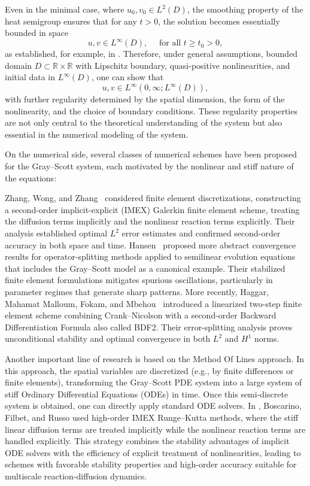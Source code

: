 \documentclass[11pt, a4paper]{amsart}
\newcommand{\RR}{\mathbb{R}}
\numberwithin{equation}{section}
\begin{document}
	Even in the minimal case, where $u_0,v_0\in L^2(D)$, the smoothing property of the heat semigroup ensures that for any $t>0$, the solution becomes essentially bounded in space
	\[
	u, v \in L^\infty(D), \quad\mbox{ for all } t\geq t_0 >0,
	\]
	as established, for example, in \cite{souplet2006global}. Therefore, under general assumptions, bounded domain $D\subset\RR\times\RR$ with Lipschitz boundary, quasi-positive nonlinearities, and initial data in $L^\infty(D)$, one can show that
	\[
	u, v \in L^\infty(0,\infty;L^\infty(D)),
	\]
	with further regularity determined by the spatial dimension, the form of the nonlinearity, and the choice of boundary conditions. These regularity properties are not only central to the theoretical understanding of the system but also essential in the numerical modeling of the system.
	
	On the numerical side, several classes of numerical schemes have been proposed for the Gray--Scott system, each motivated by the nonlinear and stiff nature of the equations:
	
	Zhang, Wong, and Zhang~\cite{zhang2008second} considered finite element discretizations, constructing a second-order implicit-explicit (IMEX) Galerkin finite element scheme, treating the diffusion terms implicitly and the nonlinear reaction terms explicitly. Their analysis established optimal $L^2$ error estimates and confirmed second-order accuracy in both space and time. Hansen~\cite{hansen2015a} proposed more abstract convergence results for operator-splitting methods applied to semilinear evolution equations that includes the Gray--Scott model as a canonical example. Their stabilized finite element formulations mitigates spurious oscillations, particularly in parameter regimes that generate sharp patterns. More recently, Haggar, Mahamat Malloum, Fokam, and Mbehou~\cite{haggar2025a} introduced a linearized two-step finite element scheme combining Crank--Nicolson with a second-order Backward Differentiation Formula also called BDF2. Their error-splitting analysis proves unconditional stability and optimal convergence in both $L^2$ and $H^1$ norms.
	
	Another important line of research is based on the Method Of Lines approach. In this approach, the spatial variables are discretized (e.g., by finite differences or finite elements), transforming the Gray--Scott PDE system into a large system of stiff Ordinary Differential Equations (ODEs) in time. Once this semi-discrete system is obtained, one can directly apply standard ODE solvers. In \cite{boscarino2016high}, Boscarino, Filbet, and Russo used high-order IMEX Runge--Kutta methods, where the stiff linear diffusion terms are treated implicitly while the nonlinear reaction terms are handled explicitly. This strategy combines the stability advantages of implicit ODE solvers with the efficiency of explicit treatment of nonlinearities, leading to schemes with favorable stability properties and high-order accuracy suitable for multiscale reaction-diffusion dynamics.
	
\end{document}
